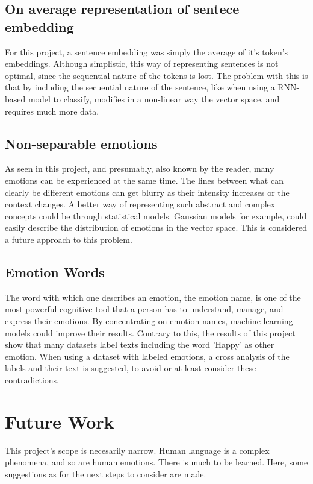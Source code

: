 \subsection{On average representation of sentece embedding}
For this project, a sentence embedding was simply the average of it's token's embeddings. Although simplistic, this way of representing sentences is not optimal, since the sequential nature of the tokens is lost. The problem with this is that by including the secuential nature of the sentence, like when using a RNN-based model to classify, modifies in a non-linear way the vector space, and requires much more data.

\subsection{Non-separable emotions}
As seen in this project, and presumably, also known by the reader, many emotions can be experienced at the same time. The lines between what can clearly be different emotions can get blurry as their intensity increases or the context changes. A better way of representing such abstract and complex concepts could be through statistical models. Gaussian models for example, could easily describe the distribution of emotions in the vector space. This is considered a future approach to this problem.

\subsection{Emotion Words}
The word with which one describes an emotion, the emotion name, is one of the most powerful cognitive tool that a person has to understand, manage, and express their emotions. By concentrating on emotion names, machine learning models could improve their results. Contrary to this, the results of this project show that many datasets label texts including the word 'Happy' as other emotion. When using a dataset with labeled emotions, a cross analysis of the labels and their text is suggested, to avoid or at least consider these contradictions.


\section{Future Work}\label{sec:Future Work}
This project's scope is necesarily narrow. Human language is a complex phenomena, and so are human emotions. There is much to be learned. Here, some suggestions as for the next steps to consider are made.

